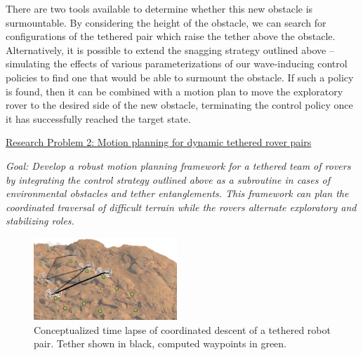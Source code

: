 \documentclass[12pt]{article}
\begin{document}
There are two tools available to determine whether this new obstacle
is surmountable. By considering the height of the obstacle, we can
search for configurations of the tethered pair which raise the tether
above the obstacle.  Alternatively, it is possible to extend the
snagging strategy outlined above -- simulating the effects of various
parameterizations of our wave-inducing control policies to find one
that would be able to surmount the obstacle. If such a policy is
found, then it can be combined with a motion plan to move the
exploratory rover to the desired side of the new obstacle, terminating
the control policy once it has successfully reached the target state.


\noindent\underline{Research Problem 2: Motion planning for dynamic
  tethered rover pairs }

{\sl Goal: Develop a robust motion planning framework for a tethered
  team of rovers by integrating the control strategy outlined above as
  a subroutine in cases of environmental obstacles and tether
  entanglements. This framework can plan the coordinated traversal of
  difficult terrain while the rovers alternate exploratory and
  stabilizing roles. }

\begin{figure}
  \begin{center}
	\vspace{-0.4in}	
	\includegraphics[width=0.48\textwidth, left]{descent_2.png}
  \end{center}
  \vspace{-0.2in}
  \label{fig:descent}
  \caption{Conceptualized time lapse of coordinated descent of a tethered robot pair. Tether shown in black, computed 
  waypoints in green.} \vspace{-.2in}
\end{figure}


\end{document}
